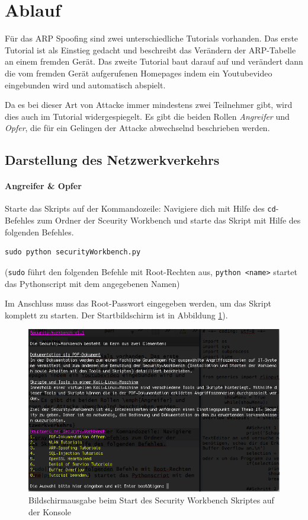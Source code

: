 \section{Ablauf}
Für das ARP Spoofing sind zwei unterschiedliche Tutorials vorhanden. Das erste Tutorial ist als Einstieg gedacht und beschreibt das Verändern der ARP-Tabelle an einem fremden Gerät. Das zweite Tutorial baut darauf auf und verändert dann die vom fremden Gerät aufgerufenen Homepages indem ein Youtubevideo eingebunden wird und automatisch abspielt.

Da es bei dieser Art von Attacke immer mindestens zwei Teilnehmer gibt, wird dies auch im Tutorial widergespiegelt. Es gibt die beiden Rollen \emph{Angreifer} und \emph{Opfer}, die für ein Gelingen der Attacke abwechselnd beschrieben werden.


\subsection{Darstellung des Netzwerkverkehrs}
\paragraph{Angreifer \& Opfer} Starte das Skripts auf der Kommandozeile: Navigiere dich mit Hilfe des \colorbox{altgray}{\lstinline|cd|}-Befehles zum Ordner der Sceurity Workbench und starte das Skript mit Hilfe des folgenden Befehles.
\begin{lstlisting}
sudo python securityWorkbench.py
\end{lstlisting}
(\colorbox{altgray}{\lstinline|sudo|} führt den folgenden Befehle mit Root-Rechten aus, \colorbox{altgray}{\lstinline|python <name>|} startet das Pythonscript mit dem angegebenen Namen)

Im Anschluss muss das Root-Passwort eingegeben werden, um das Skript komplett zu starten. Der Startbildschirm ist in Abbildung \ref{fig:scriptstart}).

\begin{figure}
	\centering
	\includegraphics[width=\textwidth]{images/Scriptstart}
	\caption{Bildschirmausgabe beim Start des Security Workbench Skriptes auf der Konsole}
	\label{fig:scriptstart}
\end{figure}

